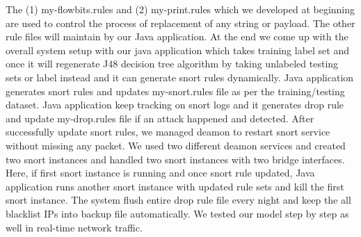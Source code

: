 The (1) my-flowbits.rules and (2) my-print.rules which we developed at beginning are used to control the process of replacement of any string or payload. The other rule files will maintain by our Java application. At the end we come up with the overall system setup with our java application which takes training label set and once it will regenerate J48 decision tree algorithm by taking unlabeled testing sets or label instead  and it can generate snort rules dynamically. Java application generates snort rules and updates my-snort.rules file as per the training/testing dataset. Java application keep tracking on snort logs and it generates drop rule and update my-drop.rules file if an attack happened and detected. After successfully update snort rules, we managed deamon to restart snort service without missing any packet. We used two different deamon services and created two snort instances and handled two snort instances with two bridge interfaces. Here, if first snort instance is running and once snort rule updated, Java application runs another snort instance with updated rule sets and kill the first snort instance. The system flush entire drop rule file every night and keep the all blacklist IPs into backup file automatically. We tested our model step by step as well in real-time network traffic.
